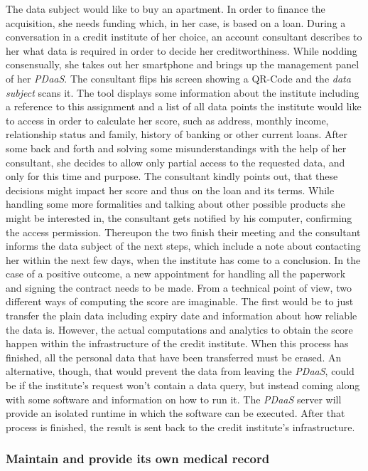 \documentclass[12pt,english,a4paper,titlepage,cleardoublepage=empty,dottedtoc]{report}
\begin{document}
The data subject would like to buy an apartment. In order to finance the
acquisition, she needs funding which, in her case, is based on a loan.
During a conversation in a credit institute of her choice, an account
consultant describes to her what data is required in order to decide her
creditworthiness. While nodding consensually, she takes out her
smartphone and brings up the management panel of her \emph{PDaaS}. The
consultant flips his screen showing a QR-Code and the \emph{data
subject} scans it. The tool displays some information about the
institute including a reference to this assignment and a list of all
data points the institute would like to access in order to calculate her
score, such as address, monthly income, relationship status and family,
history of banking or other current loans. After some back and forth and
solving some misunderstandings with the help of her consultant, she
decides to allow only partial access to the requested data, and only for
this time and purpose. The consultant kindly points out, that these
decisions might impact her score and thus on the loan and its terms.
While handling some more formalities and talking about other possible
products she might be interested in, the consultant gets notified by his
computer, confirming the access permission. Thereupon the two finish
their meeting and the consultant informs the data subject of the next
steps, which include a note about contacting her within the next few
days, when the institute has come to a conclusion. In the case of a
positive outcome, a new appointment for handling all the paperwork and
signing the contract needs to be made. From a technical point of view,
two different ways of computing the score are imaginable. The first
would be to just transfer the plain data including expiry date and
information about how reliable the data is. However, the actual
computations and analytics to obtain the score happen within the
infrastructure of the credit institute. When this process has finished,
all the personal data that have been transferred must be erased. An
alternative, though, that would prevent the data from leaving the
\emph{PDaaS}, could be if the institute's request won't contain a data
query, but instead coming along with some software and information on
how to run it. The \emph{PDaaS} server will provide an isolated runtime
in which the software can be executed. After that process is finished,
the result is sent back to the credit institute's infrastructure.

\subsubsection*{Maintain and provide its own medical
record}\label{maintain-and-provide-its-own-medical-record}
\end{document}
